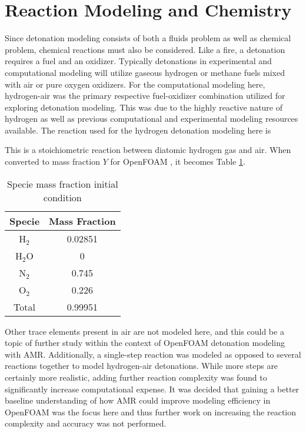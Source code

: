 \section{Reaction Modeling and Chemistry}
Since detonation modeling consists of both a fluids problem as well as chemical problem, chemical reactions must also be considered. Like a fire, a detonation requires a fuel and an oxidizer. Typically detonations in experimental and computational modeling will utilize gaseous hydrogen or methane fuels mixed with air or pure oxygen oxidizers. For the computational modeling here, hydrogen-air was the primary respective fuel-oxidizer combination utilized for exploring detonation modeling. This was due to the highly reactive nature of hydrogen as well as previous computational and experimental modeling resources available. The reaction used for the hydrogen detonation modeling here is
\begin{center}
\end{center}
This is a stoichiometric reaction between diatomic hydrogen gas and air. When converted to mass fraction \(Y\) for OpenFOAM \cite{marcantoni}, it becomes Table \ref{tab:y}.
\begin{table}[H]
\centering
\caption{Specie mass fraction initial condition}
\label{tab:y}
\begin{tabular}{cc}
Specie & Mass Fraction \\ \hline
H\(_2\) & 0.02851 \\ 
H\(_2\)O & 0 \\
N\(_2\) & 0.745 \\ 
O\(_2\) & 0.226 \\ 
Total & 0.99951 \\ 
\end{tabular}
\end{table}

Other trace elements present in air are not modeled here, and this could be a topic of further study within the context of OpenFOAM detonation modeling with AMR. Additionally, a single-step reaction was modeled as opposed to several reactions together to model hydrogen-air detonations. While more steps are certainly more realistic, adding further reaction complexity was found to significantly increase computational expense. It was decided that gaining a better baseline understanding of how AMR could improve modeling efficiency in OpenFOAM was the focus here and thus further work on increasing the reaction complexity and accuracy was not performed. 

